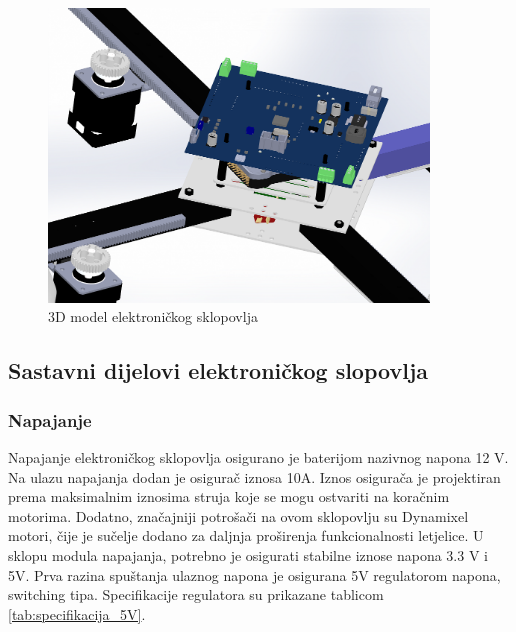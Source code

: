 \documentclass[11pt,a4paper]{article}
\begin{document}
\begin{figure}[H]
	\centering
	\includegraphics[width=0.9\textwidth]{figures/arducopter_slot_pcb.png}
	\caption{3D model elektroničkog sklopovlja}
	\label{Slika:3D_PCB}
\end{figure}

\subsection{Sastavni dijelovi elektroničkog slopovlja}

\subsubsection{Napajanje}
Napajanje elektroničkog sklopovlja osigurano je baterijom nazivnog napona 12 V. Na ulazu napajanja dodan je osigurač iznosa 10A. Iznos osigurača je projektiran prema maksimalnim iznosima struja koje se mogu ostvariti na koračnim motorima. Dodatno, značajniji potrošači na ovom sklopovlju su Dynamixel motori, čije je sučelje dodano za daljnja proširenja funkcionalnosti letjelice.
U sklopu modula napajanja, potrebno je osigurati stabilne iznose napona 3.3 V i 5V. Prva razina spuštanja ulaznog napona je osigurana 5V regulatorom napona, switching tipa. Specifikacije regulatora su prikazane tablicom \ref{tab:specifikacija_5V}.
\end{document}
